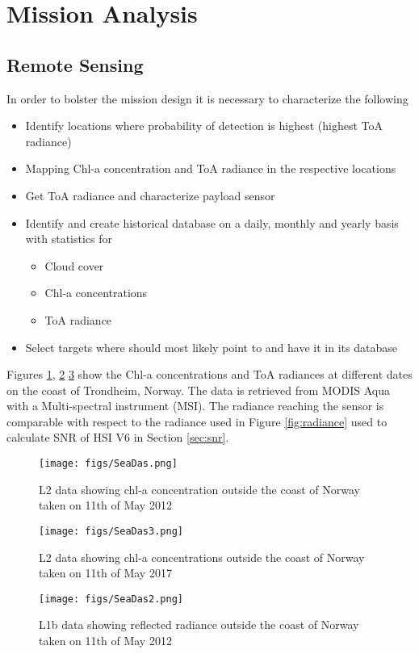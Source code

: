 \section{Mission Analysis} \label{sec:mission-analysis}
\subsection{Remote Sensing}
In order to bolster the mission design it is necessary to characterize the following
\begin{itemize}
\item Identify locations where probability of detection is highest (highest ToA radiance)
\item Mapping Chl-a concentration and ToA radiance in the respective locations
\item Get ToA radiance and characterize payload sensor
\item Identify and create historical database on a daily, monthly and yearly basis with statistics for
\begin{itemize}
\item Cloud cover
\item Chl-a concentrations
\item ToA radiance
\end{itemize} 
\item Select targets where \hypso should most likely point to and have it in its database
\end{itemize}
Figures \ref{fig:seadas1}, \ref{fig:seadas3} \ref{fig:seadas2} show the Chl-a concentrations and ToA radiances at different dates on the coast of Trondheim, Norway. The data is retrieved from MODIS Aqua with a Multi-spectral instrument (MSI). The radiance reaching the sensor is comparable with respect to the radiance used in Figure \ref{fig:radiance} used to calculate SNR of HSI V6 in Section \ref{sec:snr}.
\begin{figure}[htbp]
	\centering
	\texttt{[image: figs/SeaDas.png]}
	\caption{L2 data showing chl-a concentration outside the coast of Norway taken on 11th of May 2012}
	\label{fig:seadas1}
\end{figure}
\begin{figure}[htbp]
	\centering
	\texttt{[image: figs/SeaDas3.png]}
	\caption{L2 data showing chl-a concentrations outside the coast of Norway taken on 11th of May 2017}
	\label{fig:seadas3}
\end{figure}
\begin{figure}[htbp]
	\centering
	\texttt{[image: figs/SeaDas2.png]}
	\caption{L1b data showing reflected radiance outside the coast of Norway taken on 11th of May 2012}
	\label{fig:seadas2}
\end{figure}
